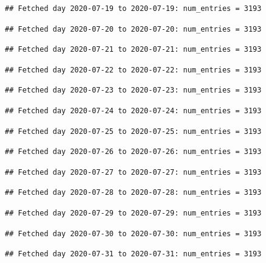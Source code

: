 \documentclass[]{article}
\begin{document}
\begin{verbatim}
## Fetched day 2020-07-19 to 2020-07-19: num_entries = 3193
\end{verbatim}

\begin{verbatim}
## Fetched day 2020-07-20 to 2020-07-20: num_entries = 3193
\end{verbatim}

\begin{verbatim}
## Fetched day 2020-07-21 to 2020-07-21: num_entries = 3193
\end{verbatim}

\begin{verbatim}
## Fetched day 2020-07-22 to 2020-07-22: num_entries = 3193
\end{verbatim}

\begin{verbatim}
## Fetched day 2020-07-23 to 2020-07-23: num_entries = 3193
\end{verbatim}

\begin{verbatim}
## Fetched day 2020-07-24 to 2020-07-24: num_entries = 3193
\end{verbatim}

\begin{verbatim}
## Fetched day 2020-07-25 to 2020-07-25: num_entries = 3193
\end{verbatim}

\begin{verbatim}
## Fetched day 2020-07-26 to 2020-07-26: num_entries = 3193
\end{verbatim}

\begin{verbatim}
## Fetched day 2020-07-27 to 2020-07-27: num_entries = 3193
\end{verbatim}

\begin{verbatim}
## Fetched day 2020-07-28 to 2020-07-28: num_entries = 3193
\end{verbatim}

\begin{verbatim}
## Fetched day 2020-07-29 to 2020-07-29: num_entries = 3193
\end{verbatim}

\begin{verbatim}
## Fetched day 2020-07-30 to 2020-07-30: num_entries = 3193
\end{verbatim}

\begin{verbatim}
## Fetched day 2020-07-31 to 2020-07-31: num_entries = 3193
\end{verbatim}
\end{document}
